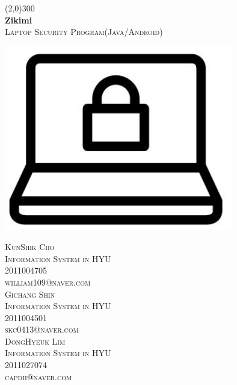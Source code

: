 \documentclass[12pt]{article}
\begin{document}
\begin{titlepage}
\begin{center}
\line(2,0){300}\\	
\huge{\bfseries Zikimi} \\
\textsc{\large Laptop Security Program(Java/Android)}\\[2\baselineskip]
\end{center} 

\center
\includegraphics[width=100mm,scale=1.4]{teamlogo}
\\ [7\baselineskip]



\begin{multicols}{3} \noindent 
\textsc {\noindent KunShik Cho\\ 
Information System in HYU \\
 2011004705 \\ 
 william109@naver.com}\\[1\baselineskip]
\textsc{Gichang Shin \\
 Information System in HYU 
 \\ 2011004501 \\ 
 skc0413@naver.com}\\[1\baselineskip]
\textsc{DongHyeuk Lim \\
Information System in HYU \\
2011027074 \\
capdh@naver.com} \\[1\baselineskip]
\end{multicols}
\end{titlepage}



\tableofcontents
{}
\cleardoublepage
\end{document}
